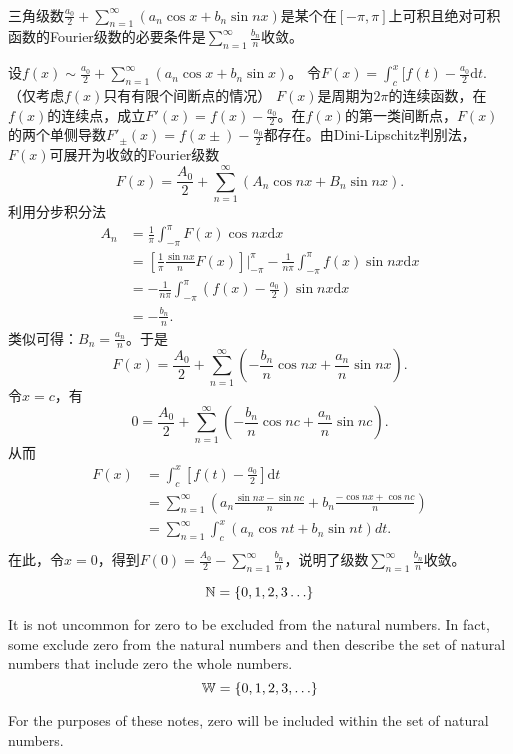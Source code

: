   \begin{exercise}
  \hfill\\
 三角级数$\displaystyle\frac{a_0}2+\sum_{n=1}^{\infty}(a_n\cos x+b_n\sin nx)$是某个在$[-\pi,\pi]$上可积且绝对可积函数的Fourier级数的必要条件是$\displaystyle\sum_{n=1}^{\infty}\frac{b_n}n$收敛。  
  
  设$f(x)\sim\frac{a_0}{2}+\sum_{n=1}^{\infty}(a_n\cos x+b_n\sin x)$。
  令$F(x)=\int_c^x[f(t)-\frac{a_0}{2}\mathrm{d}t.$（仅考虑$f(x)$只有有限个间断点的情况）
  $F(x)$是周期为$2\pi$的连续函数，在$f(x)$的连续点，成立$F'(x)=f(x)-\frac{a_0}{2}$。在$f(x)$的第一类间断点，$F(x)$的两个单侧导数$F'_{\pm}(x)=f(x\pm)-\frac{a_0}{2}$都存在。由Dini-Lipschitz判别法，$F(x)$可展开为收敛的Fourier级数$$F(x)=\frac{A_0}{2}+\sum_{n=1}^{\infty}(A_n\cos nx+B_n\sin nx).$$
  利用分步积分法
  \begin{align*}
  A_n&=\frac{1}{\pi}\int_{-\pi}^{\pi}F(x)\cos nx\mathrm{d}x\\
  &=[\frac{1}{\pi}\frac{\sin nx}{n}F(x)]|_{-\pi}^{\pi}-\frac{1}{n\pi}\int_{-\pi}^{\pi}f(x)\sin nx\mathrm{d}x\\
  &=-\frac{1}{n\pi}\int_{-\pi}^{\pi}(f(x)-\frac{a_0}{2})\sin nx\mathrm{d}x\\
  &=-\frac{b_n}{n}.
  \end{align*}
  类似可得：$B_n=\frac{a_n}{n}$。于是$$F(x)=\frac{A_0}{2}+\sum_{n=1}^{\infty}(-\frac{b_n}{n}\cos nx+\frac{a_n}{n}\sin nx).$$
  令$x=c$，有
  $$0=\frac{A_0}{2}+\sum_{n=1}^{\infty}(-\frac{b_n}{n}\cos nc+\frac{a_n}{n}\sin nc).$$
  从而
  \begin{align*}
  F(x)&=\int_c^x[f(t)-\frac{a_0}{2}]\mathrm{d}t\\
  &=\sum_{n=1}^{\infty}(a_n\frac{\sin nx-\sin nc}{n}+b_n\frac{-\cos nx+\cos nc}{n})\\
  &=\sum_{n=1}^{\infty}\int_c^x(a_n\cos nt+b_n\sin nt)dt.\\
  \end{align*}
  在此，令$x=0$，得到$F(0)=\frac{A_0}{2}-\sum_{n=1}^{\infty}\frac{b_n}{n}$，说明了级数$\sum_{n=1}^{\infty}\frac{b_n}{n}$收敛。  
  \end{exercise}


\begin{definition}

\[
\mathbb{N}=\left\{0, 1, 2, 3 \ldots\right\}
\]

\end{definition}

\begin{remark}
It is not uncommon for zero to be excluded from the natural numbers.  In fact, some exclude zero from the natural numbers and then describe the set of natural numbers that include zero the whole numbers. \\

\[
\mathbb{W}=\left\{0, 1, 2, 3, \ldots\right\}
\]

For the purposes of these notes, zero will be included within the set of natural numbers.
\end{remark}